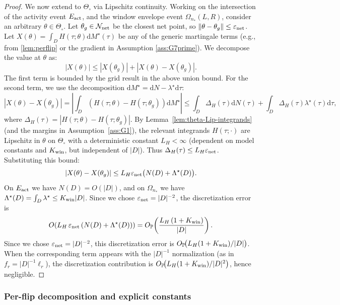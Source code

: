 \documentclass{statsoc}
\newcommand{\dd}{\mathrm{d}}
\newcommand{\1}{\mathbbm{1}}
\begin{document}
\begin{proof}
We now extend to $\Theta_\circ$ via Lipschitz continuity. Working on the intersection of  the activity event $E_{\rm act}$, and the window envelope event $\Omega_{n_*}(L,R)$, consider an arbitrary $\theta \in \Theta_\circ$. Let $\theta_g \in \mathcal{N}_{\rm net}$ be the closest net point, so $\|\theta - \theta_g\| \le \varepsilon_{\rm net}$. Let $X(\theta) = \int_D H(\tau; \theta) \dd M^\star(\tau)$ be any of the generic martingale terms (e.g., from \cref{lem:perflip} or the gradient in Assumption \ref{ass:G7prime}). We decompose the value at $\theta$ as:
\[
|X(\theta)| \le |X(\theta_g)| + |X(\theta) - X(\theta_g)|.
\]
The first term is bounded by the grid result in the above union bound. For the second term, we use the decomposition $\dd M^\star = \dd N - \lambda^\star \dd \tau$:
\[
|X(\theta) - X(\theta_g)| 
= \left| \int_D (H(\tau;\theta) - H(\tau;\theta_g)) \dd M^\star \right|
\le \int_D \Delta_H(\tau) \dd N(\tau) + \int_D \Delta_H(\tau) \lambda^\star(\tau) \dd\tau,
\]
where $\Delta_H(\tau) = |H(\tau;\theta) - H(\tau;\theta_g)|$.
By Lemma~\ref{lem:theta-Lip-integrands} (and the margins in Assumption~\ref{ass:G1}), the relevant integrands $H(\tau;\cdot)$ are Lipschitz in $\theta$ on $\Theta_\circ$ with a deterministic constant $L_H<\infty$ (dependent on model constants and $K_{\rm win}$, but independent of $|D|$). Thus $\Delta_H(\tau) \le L_H \varepsilon_{\rm net}$.
Substituting this bound:
\[
|X(\theta) - X(\theta_g)| \le L_H \varepsilon_{\rm net} \big( N(D) + \Lambda^\star(D) \big).
\]
On $E_{\rm act}$ we have $N(D)=O(|D|)$, and on $\Omega_{n_*}$ we have $\Lambda^\star(D)=\int_D \lambda^\star \le K_{\rm win}|D|$. Since we chose $\varepsilon_{\rm net}=|D|^{-2}$, the discretization error is
\[
O\!\left(L_H\,\varepsilon_{\rm net}\,(N(D)+\Lambda^\star(D))\right)
=O_{\mathbb P}\!\left(\frac{L_H\,(1+K_{\rm win})}{|D|}\right).
\]
Since we chose $\varepsilon_{\rm net}=|D|^{-2}$, this discretization error is $O_{\mathbb P}\!\big(L_H(1+K_{\rm win})/|D|\big)$. When the corresponding term appears with the $|D|^{-1}$ normalization (as in $f_r=|D|^{-1}\ell_r$), the discretization contribution is $O_{\mathbb P}\!\big(L_H(1+K_{\rm win})/|D|^2\big)$, hence negligible.

\end{proof}




\subsubsection{Per-flip decomposition and explicit constants}
\end{document}
